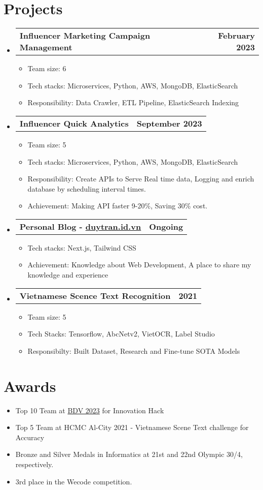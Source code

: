 \documentclass[letterpaper,11pt]{article}
\makeatletter
\newcommand{\resumeItem}[1]{
  \item\small{
    {#1 \vspace{-2pt}}
  }
}
\newcommand{\resumeProjectHeading}[2]{
    \item
    \begin{tabular*}{1.001\textwidth}{l@{\extracolsep{\fill}}r}
      \small#1 & \textbf{\small #2}\\
    \end{tabular*}\vspace{-7pt}
}
\newcommand{\resumeSubHeadingListStart}{\begin{itemize}[leftmargin=0.0in, label={}]}
\newcommand{\resumeSubHeadingListEnd}{\end{itemize}}
\newcommand{\resumeItemListStart}{\begin{itemize}}
\newcommand{\resumeItemListEnd}{\end{itemize}\vspace{-5pt}}
\makeatother
\begin{document}
\section{Projects}
    \vspace{-5pt}
    \resumeSubHeadingListStart
      \resumeProjectHeading
          {\textbf{Influencer Marketing Campaign Management}}{ February 2023}
          \resumeItemListStart
            \resumeItem{Team size: 6}
            \resumeItem{Tech stacks: Microservices, Python, AWS, MongoDB, ElasticSearch}
            \resumeItem{Responsibility: Data Crawler, ETL Pipeline, ElasticSearch Indexing}
        \resumeItemListEnd
          \vspace{-13pt}
      \resumeProjectHeading
          {\textbf{Influencer Quick Analytics}}{September 2023}
            \resumeItemListStart
                \resumeItem{Team size: 5}
                \resumeItem{Tech stacks: Microservices, Python, AWS, MongoDB, ElasticSearch}
                \resumeItem{Responsibility: Create APIs to Serve Real time data, Logging and enrich database by scheduling interval times.}
                \resumeItem{Achievement: Making API faster 9-20\%, Saving 30\% cost.}
            \resumeItemListEnd
          \vspace{-13pt}
        \resumeProjectHeading
            {\textbf{Personal Blog - \href{https://duytran.id.vn}{duytran.id.vn}}}
            {Ongoing}
            \resumeItemListStart
                \resumeItem{Tech stacks: Next.js, Tailwind CSS}
                \resumeItem{Achievement: Knowledge about Web Development, A place to share my knowledge and experience}
            \resumeItemListEnd
        \vspace{-13pt}
        \resumeProjectHeading
          {\textbf{Vietnamese Scence Text Recognition}}{ 2021}
            \resumeItemListStart
                \resumeItem{Team size: 5}
                \resumeItem{Tech Stacks: Tensorflow, AbcNetv2, VietOCR, Label Studio}
                \resumeItem{Responsibilty: Built Dataset, Research and Fine-tune SOTA Models}
            \resumeItemListEnd
    \resumeSubHeadingListEnd
\vspace{-15pt}


%
\section{Awards}
 \begin{itemize}[leftmargin=0.15in, label={}]
        \resumeItemListStart
            \resumeItem{Top 10 Team at \href{https://www.bdv.com.vn/}{BDV 2023} for Innovation Hack }
            \resumeItem{Top 5 Team at HCMC Al-City 2021 - Vietnamese Scene Text challenge for Accuracy}
            \resumeItem{Bronze and Silver Medals in Informatics at 21st and 22nd Olympic 30/4, respectively.}
            \resumeItem{3rd place in the Wecode competition.}
        \resumeItemListEnd
 \end{itemize}
 \vspace{-16pt}
\end{document}
